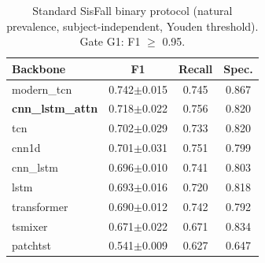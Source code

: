 \begin{table}[!t]
\centering
\caption{Standard SisFall binary protocol (natural prevalence, subject-independent, Youden threshold). Gate G1: F1 $\ge$ 0.95.}
\label{tab:standardprotocol}
\begin{tabular}{lccc}
\toprule
Backbone & F1 & Recall & Spec. \\
\midrule
modern\_tcn & 0.742$\pm$0.015 & 0.745 & 0.867 \\
\textbf{cnn\_lstm\_attn} & 0.718$\pm$0.022 & 0.756 & 0.820 \\
tcn & 0.702$\pm$0.029 & 0.733 & 0.820 \\
cnn1d & 0.701$\pm$0.031 & 0.751 & 0.799 \\
cnn\_lstm & 0.696$\pm$0.010 & 0.741 & 0.803 \\
lstm & 0.693$\pm$0.016 & 0.720 & 0.818 \\
transformer & 0.690$\pm$0.012 & 0.742 & 0.792 \\
tsmixer & 0.671$\pm$0.022 & 0.671 & 0.834 \\
patchtst & 0.541$\pm$0.009 & 0.627 & 0.647 \\
\bottomrule
\end{tabular}
\end{table}
